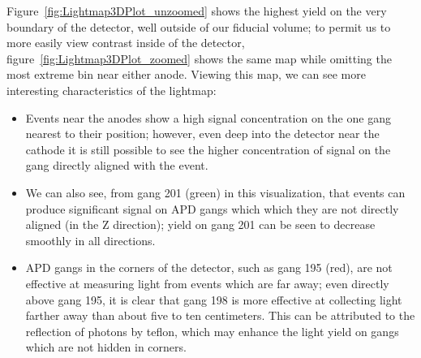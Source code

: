Figure~\ref{fig:Lightmap3DPlot_unzoomed} shows the highest yield on the very boundary of the detector, well outside of our fiducial volume; to permit us to more easily view contrast inside of the detector, figure~\ref{fig:Lightmap3DPlot_zoomed} shows the same map while omitting the most extreme bin near either anode.  Viewing this map, we can see more interesting characteristics of the lightmap:
\begin{itemize}
\item Events near the anodes show a high signal concentration on the one gang nearest to their position; however, even deep into the detector near the cathode it is still possible to see the higher concentration of signal on the gang directly aligned with the event.
\item We can also see, from gang 201 (green) in this visualization, that events can produce significant signal on APD gangs which which they are not directly aligned (in the Z direction); yield on gang 201 can be seen to decrease smoothly in all directions.
\item APD gangs in the corners of the detector, such as gang 195 (red), are not effective at measuring light from events which are far away; even directly above gang 195, it is clear that gang 198 is more effective at collecting light farther away than about five to ten centimeters.  This can be attributed to the reflection of photons by teflon, which may enhance the light yield on gangs which are not hidden in corners.
\end{itemize}

